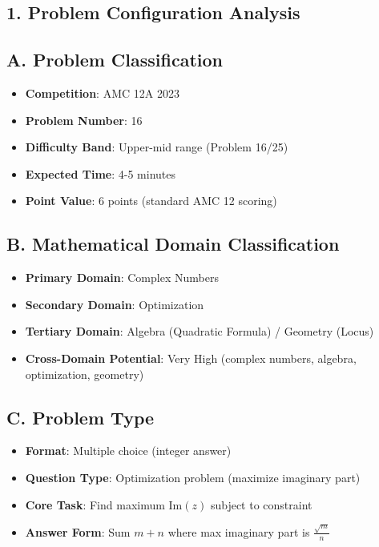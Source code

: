 \documentclass[11pt]{article}
\begin{document}
\begin{problembox}
\section*{1. Problem Configuration Analysis}

\subsection*{A. Problem Classification}
\begin{itemize}[leftmargin=*]
    \item \textbf{Competition}: AMC 12A 2023
    \item \textbf{Problem Number}: 16
    \item \textbf{Difficulty Band}: Upper-mid range (Problem 16/25)
    \item \textbf{Expected Time}: 4-5 minutes
    \item \textbf{Point Value}: 6 points (standard AMC 12 scoring)
\end{itemize}

\subsection*{B. Mathematical Domain Classification}
\begin{itemize}[leftmargin=*]
    \item \textbf{Primary Domain}: Complex Numbers
    \item \textbf{Secondary Domain}: Optimization
    \item \textbf{Tertiary Domain}: Algebra (Quadratic Formula) / Geometry (Locus)
    \item \textbf{Cross-Domain Potential}: Very High (complex numbers, algebra, optimization, geometry)
\end{itemize}

\subsection*{C. Problem Type}
\begin{itemize}[leftmargin=*]
    \item \textbf{Format}: Multiple choice (integer answer)
    \item \textbf{Question Type}: Optimization problem (maximize imaginary part)
    \item \textbf{Core Task}: Find maximum $\text{Im}(z)$ subject to constraint
    \item \textbf{Answer Form}: Sum $m + n$ where max imaginary part is $\frac{\sqrt{m}}{n}$
\end{itemize}


\end{problembox}
\end{document}
